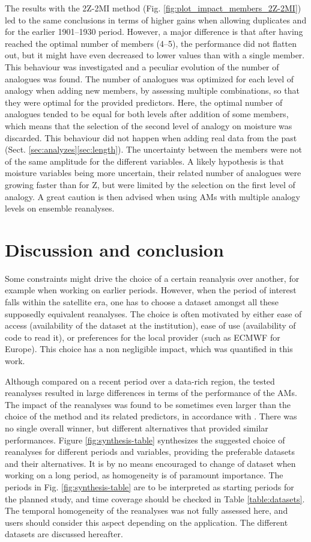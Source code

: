 \documentclass{ametsoc}
\begin{document}
The results with the 2Z-2MI method (Fig. \ref{fig:plot_impact_members_2Z-2MI}) led to the same conclusions in terms of higher gains when allowing duplicates and for the earlier 1901--1930 period. However, a major difference is that after having reached the optimal number of members (4--5), the performance did not flatten out, but it might have even decreased to lower values than with a single member. This behaviour was investigated and a peculiar evolution of the number of analogues was found. The number of analogues was optimized for each level of analogy when adding new members, by assessing multiple combinations, so that they were optimal for the provided predictors. Here, the optimal number of analogues tended to be equal for both levels after addition of some members, which means that the selection of the second level of analogy on moisture was discarded. This behaviour did not happen when adding real data from the past (Sect. \ref{sec:analyzes}\ref{sec:length}). The uncertainty between the members were not of the same amplitude for the different variables. A likely hypothesis is that moisture variables being more uncertain, their related number of analogues were growing faster than for Z, but were limited by the selection on the first level of analogy. A great caution is then advised when using AMs with multiple analogy levels on ensemble reanalyses.


\section{Discussion and conclusion}

Some constraints might drive the choice of a certain reanalysis over another, for example when working on earlier periods. However, when the period of interest falls within the satellite era, one has to choose a dataset amongst all these supposedly equivalent reanalyses. The choice is often motivated by either ease of access (availability of the dataset at the institution), ease of use (availability of code to read it), or  preferences for the local provider (such as ECMWF for Europe). This choice has a non negligible impact, which was quantified in this work.

Although compared on a recent period over a data-rich region, the tested reanalyses resulted in large differences in terms of the performance of the AMs. The impact of the reanalyses was found to be sometimes even larger than the choice of the method and its related predictors, in accordance with \citet{Dayon2015}. There was no single overall winner, but different alternatives that provided similar performances. Figure \ref{fig:synthesis-table} synthesizes the suggested choice of reanalyses for different periods and variables, providing the preferable datasets and their alternatives. It is by no means encouraged to change of dataset when working on a long period, as homogeneity is of paramount importance. The periods in Fig. \ref{fig:synthesis-table} are to be interpreted as starting periods for the planned study, and time coverage should be checked in Table \ref{table:datasets}. The temporal homogeneity of the reanalyses was not fully assessed here, and users should consider this aspect depending on the application. The different datasets are discussed hereafter.
\end{document}
